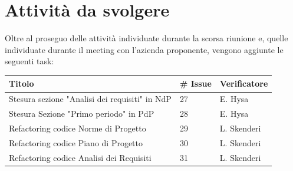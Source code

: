 \documentclass{article}
\begin{document}
\section{Attività da svolgere}
Oltre al proseguo delle attività individuate durante la scorsa riunione e, quelle individuate durante il meeting con l'azienda proponente, vengono aggiunte le seguenti task: 

    \begin{center}
        \begin{tabular}{|C{7cm}|C{1,5cm}|C{3cm}|}
            \hline
            \textbf{Titolo} & \textbf{\# Issue} & \textbf{Verificatore} \\
            \hline\hline
            Stesura sezione "Analisi dei requisiti" in NdP & 27 & E. Hysa \\
            Stesura Sezione "Primo periodo" in PdP & 28 & E. Hysa \\
            Refactoring codice Norme di Progetto & 29 & L. Skenderi \\
            Refactoring codice Piano di Progetto & 30 & L. Skenderi \\
            Refactoring codice Analisi dei Requisiti & 31 & L. Skenderi \\
            \hline
        \end{tabular}
    \end{center}
\end{document}
